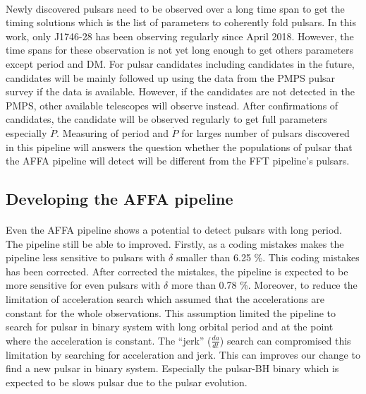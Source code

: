 \documentclass[../chapter1/thesis_msc.tex]{subfiles}
\begin{document}
\paragraph{} Newly discovered pulsars need to be observed over a long time span to get the timing solutions which is the list of parameters to coherently fold pulsars. In this work, only J1746-28 has been observing regularly since April 2018. However, the time spans for these observation is not yet long enough to get others parameters except period and DM. For pulsar candidates including candidates in the future, candidates will be mainly followed up using the data from the PMPS pulsar survey if the data is available. However, if the candidates are not detected in the PMPS, other available telescopes will observe instead. After confirmations of candidates, the candidate will be observed regularly to get full parameters especially $\Dot{P}$. Measuring of period and $\Dot{P}$ for larges number of pulsars discovered in this pipeline will answers the question whether the populations of pulsar that the AFFA pipeline will detect will be different from the FFT pipeline's pulsars.   
\subsection{Developing the AFFA pipeline}
\paragraph{} Even the AFFA pipeline shows a potential to detect pulsars with long period. The pipeline still be able to improved. Firstly, as a coding mistakes makes the pipeline less sensitive to pulsars with $\delta$ smaller than 6.25 \%. This coding mistakes has been corrected. After corrected the mistakes, the pipeline is expected to be more sensitive for even pulsars with  $\delta$ more than 0.78 \%.  Moreover, to reduce the limitation of acceleration search which assumed that the accelerations are constant for the whole observations. This assumption limited the pipeline to search for pulsar in binary system with long orbital period and at the point where the acceleration is constant. The ``jerk'' ($\frac{da}{dt}$) search can compromised this limitation by searching for acceleration and jerk. This can improves our change to find a new pulsar in binary system. Especially the pulsar-BH binary which is expected to be slows pulsar due to  the pulsar evolution.      
\end{document}
